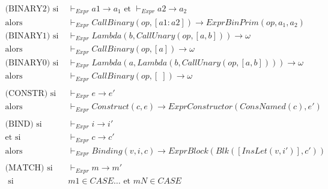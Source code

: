 \documentclass[
  12pt,
]{article}
\begin{document}
\begin{align*}
  \text{(BINARY2)} \text{ si } & \vdash_{Expr} a1 \rightarrow  a_1 \text{ et }  \vdash_{Expr} a2 \rightarrow  a_2                                        \\
  \text{alors}                 & \vdash_{Expr} CallBinary(op, [a1:a2]) \rightarrow  ExprBinPrim(op, a_1, a_2)                                            \\
  \text{(BINARY1)}
  \text{ si }                  & \vdash_{Expr} Lambda(b,CallUnary(op, [a,b])) \rightarrow  \omega                                                        \\
  \text{alors}                 & \vdash_{Expr} CallBinary(op, [a]) \rightarrow \omega                                                                    \\
  \text{(BINARY0)}
  \text{ si }                  & \vdash_{Expr} Lambda(a,Lambda(b,CallUnary(op, [a,b]))) \rightarrow  \omega                                              \\
  \text{alors}                 & \vdash_{Expr} CallBinary(op, [\;]) \rightarrow \omega                                                                   \\
  \\
  \text{(CONSTR)} \text{ si }  & \vdash_{Expr} e \rightarrow  e'                                                                                         \\
  \text{alors}                 & \vdash_{Expr} Construct(c,e) \rightarrow  ExprConstructor(ConsNamed(c), e')                                             \\
  \\
  \text{(BIND)} \text{ si }    & \vdash_{Expr} i \rightarrow  i'                                                                                         \\
  \text{et si }                & \vdash_{Expr} c \rightarrow  c'                                                                                         \\
  \text{alors}                 & \vdash_{Expr} Binding(v,i,c) \rightarrow  ExprBlock(Blk([InsLet (v, i')], c'))                                          \\
  \\
  \text{(MATCH)} \text{ si }   & \vdash_{Expr} m \rightarrow  m'                                                                                         \\
  \text{ si }                  & m1  \in CASE \dots \text{ et } mN  \in CASE                                                                             \\

\end{align*}
\end{document}
